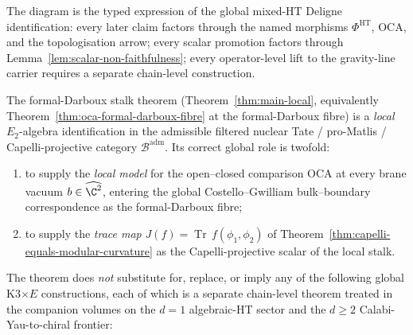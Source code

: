 The diagram is the typed expression of the global mixed-HT Deligne
identification: every later claim factors through the named morphisms
\(\Phi^{\mathrm{HT}}\), \(\mathrm{OCA}\), and the topologisation
arrow; every scalar promotion factors through
Lemma~\ref{lem:scalar-non-faithfulness}; every operator-level lift to
the gravity-line carrier requires a separate chain-level
construction.

\begin{rmk}
\label{rmk:formal-darboux-stalk-non-promotion}
The formal-Darboux stalk theorem
(Theorem~\ref{thm:main-local}, equivalently
Theorem~\ref{thm:oca-formal-darboux-fibre} at the formal-Darboux
fibre) is a \emph{local} \(E_2\)-algebra identification in the
admissible filtered nuclear Tate / pro-Matlis / Capelli-projective
category \(\mathcal B^{\mathrm{adm}}\).  Its correct global role is
twofold:
\begin{enumerate}[label=\textup{(\roman*)}]
  \item to supply the \emph{local model} for the open--closed
        comparison \(\mathrm{OCA}\) at every brane vacuum
        \(b\in\widehat{\C^2}\), entering the global Costello--Gwilliam
        bulk--boundary correspondence as the formal-Darboux fibre;
  \item to supply the \emph{trace map}
        \(J(f) = \operatorname{Tr}\,f(\phi_1,\phi_2)\) of
        Theorem~\ref{thm:capelli-equals-modular-curvature} as the
        Capelli-projective scalar of the local stalk.
\end{enumerate}
The theorem does \emph{not} substitute for, replace, or imply any of
the following global K3\(\times E\) constructions, each of which
is a separate chain-level theorem treated in the companion volumes
on the $d=1$ algebraic-HT sector and the $d\geq 2$ Calabi-Yau-to-chiral
frontier:
\end{rmk}
